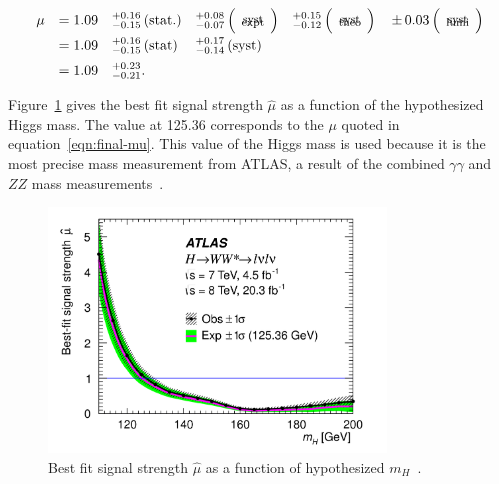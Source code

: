 \begin{equation}
\begin{array}{llllll}
 \mu
 &= 1.09%
 &^{+0.16}_{-0.15}\,(\textrm{stat.})%
 &^{+0.08}_{-0.07}\,\Big(\!\begin{tabular}{c}{\rm\footnotesize expt}\\ \noalign{\vskip -0.50truecm}{\rm\footnotesize syst}\end{tabular}\!\Big)%
 &^{+0.15}_{-0.12}\,\Big(\!\begin{tabular}{c}{\rm\footnotesize theo}\\ \noalign{\vskip -0.50truecm}{\rm\footnotesize syst}\end{tabular}\!\Big)%
 &{\PM}0.03\,\Big(\!\begin{tabular}{c}{\rm\footnotesize lumi}\\ \noalign{\vskip -0.50truecm}{\rm\footnotesize syst}\end{tabular}\!\Big)%
 \\
 \clineskip
 &= 1.09 &^{+0.16}_{-0.15}\,\textrm{(stat)} &^{+0.17}_{-0.14}\,\textrm{(syst)}
 \\
 \clineskip
 \clineskip
 &= 1.09 &^{+0.23}_{-0.21}.
\end{array}
\label{eqn:final-mu}
\end{equation}

Figure~\ref{fig:mu-val} gives the best fit signal strength $\hat{\mu}$ as a function of the hypothesized Higgs mass. The value at 125.36 \GeV corresponds to the $\mu$ quoted in equation~\ref{eqn:final-mu}. This value of the Higgs mass is used because it is the most precise mass measurement from ATLAS, a result of the combined $\gamma\gamma$ and $ZZ$ mass measurements~\cite{MassMeasurement}.

\begin{figure}[h!]
  \centering
  \captionsetup{justification=centering}

  \includegraphics[width=0.8\textwidth]{figures/mu_mass}
  \caption{Best fit signal strength $\hat{\mu}$ as a function of hypothesized $m_{H}$~\cite{WW2015}.}
  \label{fig:mu-val}
\end{figure}

